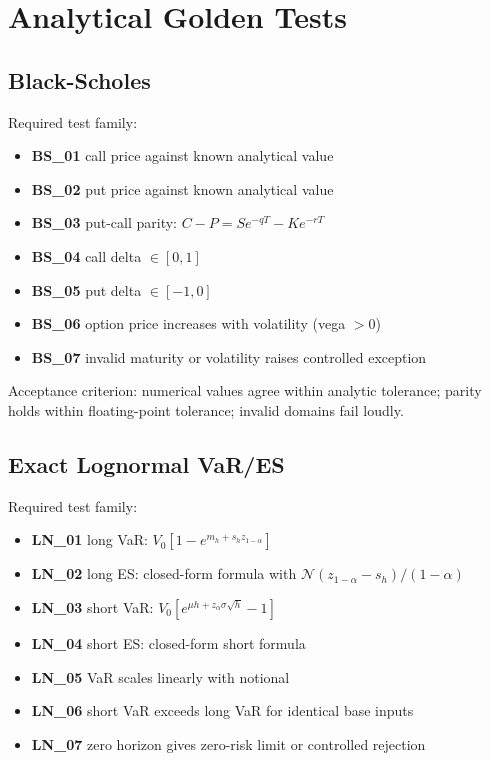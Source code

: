 \documentclass[11pt]{article}
\begin{document}
\section{Analytical Golden Tests}

\subsection{Black-Scholes}

Required test family:

\begin{itemize}
  \item \textbf{BS\_01} call price against known analytical value
  \item \textbf{BS\_02} put price against known analytical value
  \item \textbf{BS\_03} put-call parity: $C - P = S e^{-qT} - K e^{-rT}$
  \item \textbf{BS\_04} call delta $\in [0,1]$
  \item \textbf{BS\_05} put delta $\in [-1,0]$
  \item \textbf{BS\_06} option price increases with volatility (vega $> 0$)
  \item \textbf{BS\_07} invalid maturity or volatility raises controlled exception
\end{itemize}

Acceptance criterion: numerical values agree within analytic tolerance;
parity holds within floating-point tolerance; invalid domains fail loudly.

\subsection{Exact Lognormal VaR/ES}

Required test family:

\begin{itemize}
  \item \textbf{LN\_01} long VaR: $V_0[1 - e^{m_h + s_h z_{1-\alpha}}]$
  \item \textbf{LN\_02} long ES: closed-form formula with $\mathcal{N}(z_{1-\alpha} - s_h)/(1-\alpha)$
  \item \textbf{LN\_03} short VaR: $V_0[e^{\mu h + z_\alpha \sigma\sqrt{h}} - 1]$
  \item \textbf{LN\_04} short ES: closed-form short formula
  \item \textbf{LN\_05} VaR scales linearly with notional
  \item \textbf{LN\_06} short VaR exceeds long VaR for identical base inputs
  \item \textbf{LN\_07} zero horizon gives zero-risk limit or controlled rejection
\end{itemize}
\end{document}
